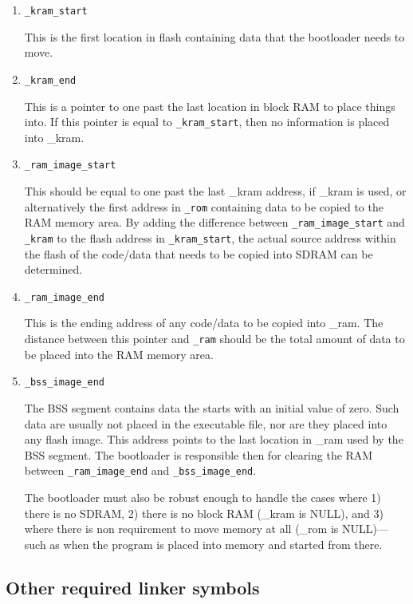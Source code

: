 \documentclass{gqtekspec}
\begin{document}
\begin{enumerate}
\item {\tt \_kram\_start}

	This is the first location in flash containing data that the bootloader
	needs to move.

\item {\tt \_kram\_end}

	This is a pointer to one past the last location in block RAM to place
	things into.  If this pointer is equal to {\tt \_kram\_start},
	then no information is placed into \_kram.

\item {\tt \_ram\_image\_start}

	This should be equal to one past the last \_kram address, if \_kram
	is used, or alternatively the first address in {\tt \_rom} containing
	data to be copied to the RAM memory area.  By adding the difference
	between {\tt \_ram\_image\_start} and {\tt \_kram} to the flash address
	in {\tt \_kram\_start}, the actual source address within the
	flash of the code/data that needs to be copied into SDRAM can be
	determined.

\item {\tt \_ram\_image\_end}

	This is the ending address of any code/data to be copied into \_ram.
	The distance between this pointer and {\tt \_ram} should be the total
	amount of data to be placed into the RAM memory area.

\item {\tt \_bss\_image\_end}

	The BSS segment contains data the starts with an initial value of
	zero.  Such data are usually not placed in the executable file, nor
	are they placed into any flash image.  This address points to the
	last location in \_ram used by the BSS segment.  The bootloader
	is responsible then for clearing the RAM between
	{\tt \_ram\_image\_end} and {\tt \_bss\_image\_end}.

	The bootloader must also be robust enough to handle the cases where
	1) there is no SDRAM, 2) there is no block RAM (\_kram is NULL), and
	3) where there is non requirement to move memory at all (\_rom is
	NULL)---such as when the program is placed into memory and started
	from there.
\end{enumerate}
\subsection{Other required linker symbols}\label{sec:ld-other}
\end{document}
